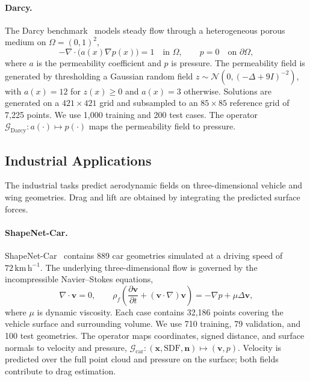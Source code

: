 \documentclass{article}
\begin{document}
\paragraph{Darcy.}
The Darcy benchmark~\citep{li2021fno} models steady flow through a heterogeneous porous medium on $\Omega=(0,1)^2$,
\begin{equation}
    -\nabla\!\cdot\bigl(a(x)\nabla p(x)\bigr)=1
    \quad\text{in }\Omega,
    \qquad
    p=0\quad\text{on }\partial\Omega,
    \label{eq:app_darcy}
\end{equation}
where $a$ is the permeability coefficient and $p$ is pressure. The permeability field is generated by thresholding a Gaussian random field \(z\sim\mathcal{N}(0,(-\Delta+9I)^{-2})\), with \(a(x)=12\) for \(z(x)\geq0\) and \(a(x)=3\) otherwise. Solutions are generated on a $421\times421$ grid and subsampled to an $85\times85$ reference grid of 7,225 points. We use 1,000 training and 200 test cases. The operator $\mathcal{G}_{\mathrm{Darcy}}:a(\cdot)\mapsto p(\cdot)$ maps the permeability field to pressure.

\subsection{Industrial Applications}
\label{app:industrial_benchmarks}

The industrial tasks predict aerodynamic fields on three-dimensional vehicle and wing geometries. Drag and lift are obtained by integrating the predicted surface forces.

\paragraph{ShapeNet-Car.}
ShapeNet-Car~\citep{umetani2018learning,wu2024transolver} contains 889 car geometries simulated at a driving speed of $72\,\mathrm{km\,h^{-1}}$. The underlying three-dimensional flow is governed by the incompressible Navier--Stokes equations,
\begin{equation}
    \nabla\!\cdot\mathbf{v}=0,
    \qquad
    \rho_f\left(\frac{\partial\mathbf{v}}{\partial t}
    +(\mathbf{v}\!\cdot\nabla)\mathbf{v}\right)
    =-\nabla p+\mu\Delta\mathbf{v},
    \label{eq:app_shapenet_car}
\end{equation}
where $\mu$ is dynamic viscosity. Each case contains 32,186 points covering the vehicle surface and surrounding volume. We use 710 training, 79 validation, and 100 test geometries. The operator maps coordinates, signed distance, and surface normals to velocity and pressure, $\mathcal{G}_{\mathrm{car}}:(\mathbf{x},\mathrm{SDF},\mathbf{n})\mapsto(\mathbf{v},p)$. Velocity is predicted over the full point cloud and pressure on the surface; both fields contribute to drag estimation.
\end{document}
